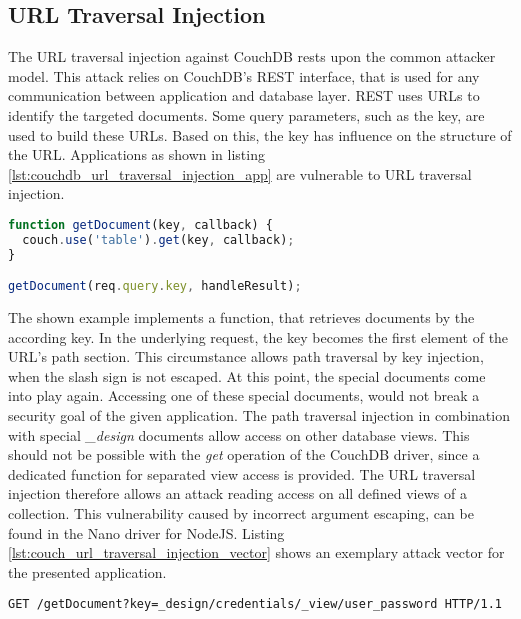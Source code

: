 \subsection{URL Traversal Injection}
The URL traversal injection against CouchDB rests upon the common attacker model. This attack relies on CouchDB's REST interface, that is used for any communication between application and database layer. REST uses URLs to identify the targeted documents. Some query parameters, such as the key, are used to build these URLs. Based on this, the key has influence on the structure of the URL. Applications as shown in listing \ref{lst:couchdb_url_traversal_injection_app} are vulnerable to URL traversal injection. \\

\begin{lstlisting}[caption={Vulnerable NodeJS example for URL traversal injection against CouchDB}, label={lst:couchdb_url_traversal_injection_app}, language=JavaScript]
function getDocument(key, callback) {
  couch.use('table').get(key, callback);
}

getDocument(req.query.key, handleResult);
\end{lstlisting}

The shown example implements a function, that retrieves documents by the according key. In the underlying request, the key becomes the first element of the URL's path section. This circumstance allows path traversal by key injection, when the slash sign is not escaped. At this point, the special documents come into play again. Accessing one of these special documents, would not break a security goal of the given application. The path traversal injection in combination with special \emph{\_design} documents allow access on other database views. This should not be possible with the \emph{get} operation of the CouchDB driver, since a dedicated function for separated view access is provided. The URL traversal injection therefore allows an attack reading access on all defined views of a collection. This vulnerability caused by incorrect argument escaping, can be found in the Nano driver for NodeJS. Listing \ref{lst:couch_url_traversal_injection_vector} shows an exemplary attack vector for the presented application. \\

\begin{lstlisting}[caption={Attack vector against CouchDB for URL traversal injection via the query-string parameter}, label={lst:couch_url_traversal_injection_vector}]
GET /getDocument?key=_design/credentials/_view/user_password HTTP/1.1
\end{lstlisting}

